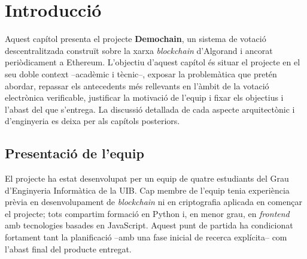 
\chapter{Introducció}
\label{cap:introduccio}

Aquest capítol presenta el projecte \textbf{Demochain}, un sistema de votació
descentralitzada construït sobre la xarxa \emph{blockchain} d'Algorand i
ancorat periòdicament a Ethereum. L'objectiu d'aquest capítol és situar el
projecte en el seu doble context --acadèmic i tècnic--, exposar la problemàtica
que pretén abordar, repassar els antecedents més rellevants en l'àmbit de la
votació electrònica verificable, justificar la motivació de l'equip i fixar
els objectius i l'abast del que s'entrega. La discussió detallada de cada
aspecte arquitectònic i d'enginyeria es deixa per als capítols posteriors.

\section{Presentació de l'equip}
\label{sec:equip}

El projecte ha estat desenvolupat per un equip de quatre estudiants del
Grau d'Enginyeria Informàtica de la \ac{UIB}. Cap membre de l'equip tenia
experiència prèvia en desenvolupament de \emph{blockchain} ni en
criptografia aplicada en començar el projecte; tots compartim formació en
Python i, en menor grau, en \emph{frontend} amb tecnologies basades en
JavaScript. Aquest punt de partida ha condicionat fortament tant la
planificació --amb una fase inicial de recerca explícita-- com l'abast
final del producte entregat.

